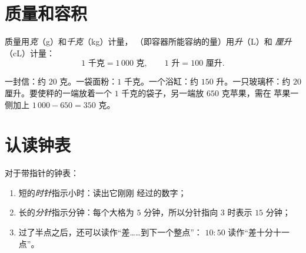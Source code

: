 \section{质量和容积}

\begin{definition}[质量和容积的单位]\label{def:g3:measure:mass}
质量用\emph{克}（g）和\emph{千克}（kg）计量，
（即容器所能容纳的量）用\emph{升}（L）和
\emph{厘升}（cL）计量：
\[
1 \text{ 千克} = 1\,000 \text{ 克},
\qquad
1 \text{ 升} = 100 \text{ 厘升}.
\]
\end{definition}

\begin{example}\label{ex:g3:measure:mass}
一封信：约 $20$ 克。一袋面粉：$1$ 千克。一个浴缸：约
$150$ 升。一只玻璃杯：约 $20$ 厘升。要使秤的一端放着一个
$1$ 千克的袋子，另一端放 $650$ 克苹果，需在
苹果一侧加上 $1\,000 - 650 = 350$ 克。
\end{example}

\section{认读钟表}

\begin{method}[读时间]\label{met:g3:measure:clock}
对于带指针的钟表：
\begin{enumerate}
  \item 短的\emph{时针}指示小时：读出它刚刚
        经过的数字；
  \item 长的\emph{分针}指示分钟：每个大格为 $5$
        分钟，所以分针指向 $3$ 时表示 $15$ 分钟；
  \item 过了半点之后，还可以读作“差……到下一个整点”：
        $10{:}50$ 读作“差十分十一点”。
\end{enumerate}
\end{method}


